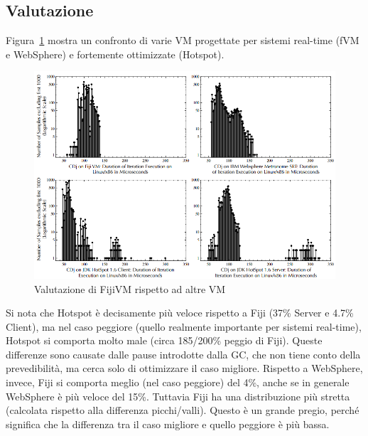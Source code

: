 

\subsection{Valutazione}
Figura~\ref{fig:fijicomp} mostra un confronto di varie VM progettate per sistemi real-time (fVM e WebSphere) e fortemente ottimizzate (Hotspot). 
\begin{figure}[h]
	\centering
	\includegraphics[width=0.8\linewidth]{images/fijicomp}
	\caption[Valutazione rispetto ad altre VM]{Valutazione di FijiVM rispetto ad altre VM}
	\label{fig:fijicomp}
\end{figure}

Si nota che Hotspot è decisamente più veloce rispetto a Fiji (37\% Server e 4.7\% Client), ma nel caso peggiore (quello realmente importante per sistemi real-time), Hotspot si comporta molto male (circa 185/200\% peggio di Fiji). Queste differenze sono causate dalle pause introdotte dalla GC, che non tiene conto della prevedibilità, ma cerca solo di ottimizzare il caso migliore. Rispetto a WebSphere, invece, Fiji si comporta meglio (nel caso peggiore) del 4\%, anche se in generale WebSphere è più veloce del 15\%. Tuttavia Fiji ha una distribuzione più stretta (calcolata rispetto alla differenza picchi/valli). Questo è un grande pregio, perché significa che la differenza tra il caso migliore e quello peggiore è più bassa.

